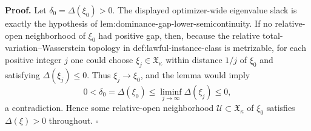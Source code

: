 \textbf{Proof.}
Let \(\delta_0=\Delta(\xi_0)>0\).  The displayed optimizer-wide eigenvalue slack is exactly the hypothesis of lem:dominance-gap-lower-semicontinuity.  If no relative-open neighborhood of \(\xi_0\) had positive gap, then, because the relative total-variation--Wasserstein topology in def:lawful-instance-class is metrizable, for each positive integer \(j\) one could choose \(\xi_j\in\mathfrak X_\kappa\) within distance \(1/j\) of \(\xi_0\) and satisfying \(\Delta(\xi_j)\le0\).  Thus \(\xi_j\to\xi_0\), and the lemma would imply
\[
0<\delta_0=\Delta(\xi_0)
\le\liminf_{j\to\infty}\Delta(\xi_j)
\le0,
\]
a contradiction.  Hence some relative-open neighborhood \(\mathcal U\subset\mathfrak X_\kappa\) of \(\xi_0\) satisfies \(\Delta(\xi)>0\) throughout. \(\square\)